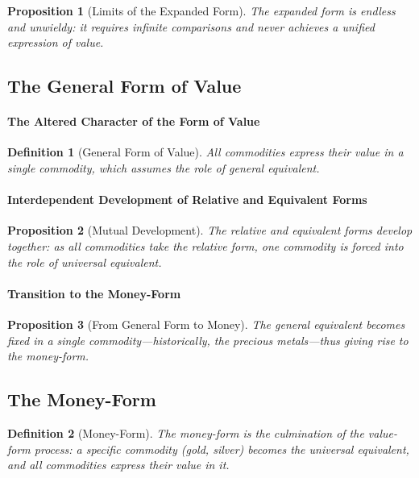 \documentclass{article}
\newtheorem{innerdef}{Definition}
\newtheorem{innerprop}{Proposition}
\newenvironment{definition}{\begin{innerdef}}{\end{innerdef}}
\newenvironment{proposition}{\begin{innerprop}}{\end{innerprop}}
\begin{document}
\begin{proposition}[Limits of the Expanded Form]
The expanded form is endless and unwieldy: 
it requires infinite comparisons and never achieves a unified expression of value.
\end{proposition}

\subsection{The General Form of Value} %

\paragraph{The Altered Character of the Form of Value} %

\begin{definition}[General Form of Value]
All commodities express their value in a single commodity, which assumes the role of general equivalent.
\end{definition}

\paragraph{Interdependent Development of Relative and Equivalent Forms} %

\begin{proposition}[Mutual Development]
The relative and equivalent forms develop together: 
as all commodities take the relative form, one commodity is forced into the role of universal equivalent.
\end{proposition}

\paragraph{Transition to the Money-Form} %

\begin{proposition}[From General Form to Money]
The general equivalent becomes fixed in a single commodity—historically, the precious metals—thus giving rise to the money-form.
\end{proposition}

\subsection{The Money-Form} %

\begin{definition}[Money-Form]
The money-form is the culmination of the value-form process: 
a specific commodity (gold, silver) becomes the universal equivalent, 
and all commodities express their value in it.
\end{definition}
\end{document}

